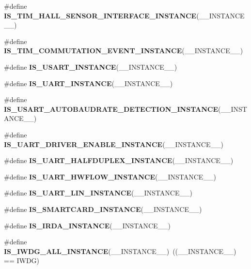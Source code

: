 \begin{DoxyCompactItemize}
\item 
\#define {\bfseries I\+S\+\_\+\+T\+I\+M\+\_\+\+H\+A\+L\+L\+\_\+\+S\+E\+N\+S\+O\+R\+\_\+\+I\+N\+T\+E\+R\+F\+A\+C\+E\+\_\+\+I\+N\+S\+T\+A\+N\+CE}(\+\_\+\+\_\+\+I\+N\+S\+T\+A\+N\+C\+E\+\_\+\+\_\+)
\item 
\#define {\bfseries I\+S\+\_\+\+T\+I\+M\+\_\+\+C\+O\+M\+M\+U\+T\+A\+T\+I\+O\+N\+\_\+\+E\+V\+E\+N\+T\+\_\+\+I\+N\+S\+T\+A\+N\+CE}(\+\_\+\+\_\+\+I\+N\+S\+T\+A\+N\+C\+E\+\_\+\+\_\+)
\item 
\#define {\bfseries I\+S\+\_\+\+U\+S\+A\+R\+T\+\_\+\+I\+N\+S\+T\+A\+N\+CE}(\+\_\+\+\_\+\+I\+N\+S\+T\+A\+N\+C\+E\+\_\+\+\_\+)
\item 
\#define {\bfseries I\+S\+\_\+\+U\+A\+R\+T\+\_\+\+I\+N\+S\+T\+A\+N\+CE}(\+\_\+\+\_\+\+I\+N\+S\+T\+A\+N\+C\+E\+\_\+\+\_\+)
\item 
\#define {\bfseries I\+S\+\_\+\+U\+S\+A\+R\+T\+\_\+\+A\+U\+T\+O\+B\+A\+U\+D\+R\+A\+T\+E\+\_\+\+D\+E\+T\+E\+C\+T\+I\+O\+N\+\_\+\+I\+N\+S\+T\+A\+N\+CE}(\+\_\+\+\_\+\+I\+N\+S\+T\+A\+N\+C\+E\+\_\+\+\_\+)
\item 
\#define {\bfseries I\+S\+\_\+\+U\+A\+R\+T\+\_\+\+D\+R\+I\+V\+E\+R\+\_\+\+E\+N\+A\+B\+L\+E\+\_\+\+I\+N\+S\+T\+A\+N\+CE}(\+\_\+\+\_\+\+I\+N\+S\+T\+A\+N\+C\+E\+\_\+\+\_\+)
\item 
\#define {\bfseries I\+S\+\_\+\+U\+A\+R\+T\+\_\+\+H\+A\+L\+F\+D\+U\+P\+L\+E\+X\+\_\+\+I\+N\+S\+T\+A\+N\+CE}(\+\_\+\+\_\+\+I\+N\+S\+T\+A\+N\+C\+E\+\_\+\+\_\+)
\item 
\#define {\bfseries I\+S\+\_\+\+U\+A\+R\+T\+\_\+\+H\+W\+F\+L\+O\+W\+\_\+\+I\+N\+S\+T\+A\+N\+CE}(\+\_\+\+\_\+\+I\+N\+S\+T\+A\+N\+C\+E\+\_\+\+\_\+)
\item 
\#define {\bfseries I\+S\+\_\+\+U\+A\+R\+T\+\_\+\+L\+I\+N\+\_\+\+I\+N\+S\+T\+A\+N\+CE}(\+\_\+\+\_\+\+I\+N\+S\+T\+A\+N\+C\+E\+\_\+\+\_\+)
\item 
\#define {\bfseries I\+S\+\_\+\+S\+M\+A\+R\+T\+C\+A\+R\+D\+\_\+\+I\+N\+S\+T\+A\+N\+CE}(\+\_\+\+\_\+\+I\+N\+S\+T\+A\+N\+C\+E\+\_\+\+\_\+)
\item 
\#define {\bfseries I\+S\+\_\+\+I\+R\+D\+A\+\_\+\+I\+N\+S\+T\+A\+N\+CE}(\+\_\+\+\_\+\+I\+N\+S\+T\+A\+N\+C\+E\+\_\+\+\_\+)
\item 
\mbox{\label{group___exported__macros_gafe721187da8378d5982d6d079abd5b2b}} 
\#define {\bfseries I\+S\+\_\+\+I\+W\+D\+G\+\_\+\+A\+L\+L\+\_\+\+I\+N\+S\+T\+A\+N\+CE}(\+\_\+\+\_\+\+I\+N\+S\+T\+A\+N\+C\+E\+\_\+\+\_\+)~((\+\_\+\+\_\+\+I\+N\+S\+T\+A\+N\+C\+E\+\_\+\+\_\+) == I\+W\+DG)

\end{DoxyCompactItemize}

